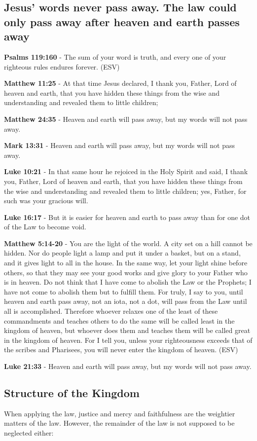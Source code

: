 \documentclass[11pt]{article}
\begin{document}
\subsection{Jesus' words never pass away. The law could only pass away after heaven and earth passes away}
\label{sec:orgc230fc3}
\textbf{Psalms 119:160} - The sum of your word is truth, and every one of your righteous rules endures forever. (ESV)

\textbf{Matthew 11:25} - At that time Jesus declared, I thank you, Father, Lord of heaven and earth, that you have hidden these things from the wise and understanding and revealed them to little children;

\textbf{Matthew 24:35} - Heaven and earth will pass away, but my words will not pass away.

\textbf{Mark 13:31} - Heaven and earth will pass away, but my words will not pass away.

\textbf{Luke 10:21} - In that same hour he rejoiced in the Holy Spirit and said, I thank you, Father, Lord of heaven and earth, that you have hidden these things from the wise and understanding and revealed them to little children; yes, Father, for such was your gracious will.

\textbf{Luke 16:17} - But it is easier for heaven and earth to pass away than for one dot of the Law to become void.

\textbf{Matthew 5:14-20} - You are the light of the world. A city set on a hill cannot be hidden. Nor do people light a lamp and put it under a basket, but on a stand, and it gives light to all in the house. In the same way, let your light shine before others, so that they may see your good works and give glory to your Father who is in heaven. Do not think that I have come to abolish the Law or the Prophets; I have not come to abolish them but to fulfill them. For truly, I say to you, until heaven and earth pass away, not an iota, not a dot, will pass from the Law until all is accomplished. Therefore whoever relaxes one of the least of these commandments and teaches others to do the same will be called least in the kingdom of heaven, but whoever does them and teaches them will be called great in the kingdom of heaven. For I tell you, unless your righteousness exceeds that of the scribes and Pharisees, you will never enter the kingdom of heaven. (ESV)

\textbf{Luke 21:33} - Heaven and earth will pass away, but my words will not pass away.

\subsection{Structure of the Kingdom}
\label{sec:org6017d6c}
When applying the law, justice and mercy and faithfulness are the weightier matters of the law.
However, the remainder of the law is not supposed to be neglected either:
\end{document}
